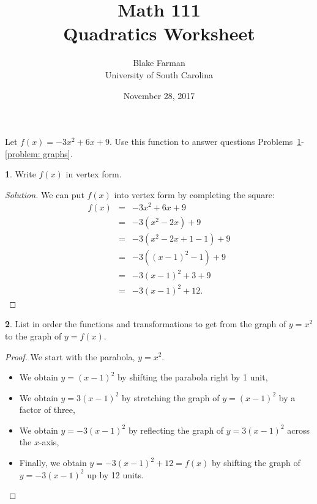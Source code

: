 \documentclass[12pt]{amsart}
\author[Blake Farman]{Blake Farman\\University of South Carolina}
\title[Quadratic Worksheet]{Math 111\\Quadratics Worksheet}
\date{November 28, 2017}
\theoremstyle{definition}
\newtheorem{thm}{}
\begin{document}
\maketitle

\vspace{0.2in}
\vspace{0.2in}

Let $f(x) = -3x^2 + 6x + 9$.
Use this function to answer questions Problems~\ref{problem: vertex form}-\ref{problem: graphs}.
\begin{thm}\label{problem: vertex form}
    Write $f(x)$ in vertex form.
\end{thm}
\begin{proof}[Solution]
  We can put $f(x)$ into vertex form by completing the square:
  \begin{eqnarray*}
    f(x) &=& -3x^2 + 6x + 9\\
    &=& -3(x^2 - 2x) + 9\\
    &=& -3(x^2 - 2x + 1 - 1) + 9\\
    &=& -3((x - 1)^2 -1) + 9\\
    &=& -3(x-1)^2 + 3 + 9\\
    &=& -3(x - 1)^2 + 12. 
  \end{eqnarray*}
\end{proof}

\begin{thm}\label{problem: functions and transformations}
  List in order the functions and transformations to get from the graph of $y = x^2$ to the graph of $y = f(x)$.
\end{thm}
\begin{proof}
  We start with the parabola, $y = x^2$.
  \begin{itemize}
  \item
    We obtain $y = (x - 1)^2$ by shifting the parabola right by 1 unit,
  \item
    We obtain $y = 3(x - 1)^2$ by stretching the graph of $y = (x - 1)^2$ by a factor of three,
  \item
    We obtain $y = -3(x - 1)^2$ by reflecting the graph of $y = 3(x - 1)^2$ across the $x$-axis,
  \item
    Finally, we obtain $y = -3(x - 1)^2 + 12 = f(x)$ by shifting the graph of $y = -3(x - 1)^2$ up by 12 units.
  \end{itemize}
\end{proof}

\newpage
\end{document}
